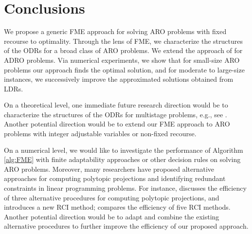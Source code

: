\documentclass[fleqn,mnsc,blindrev]{informs4}
\begin{document}
		
		\section{Conclusions} \label{sec:con}
		We propose a generic FME approach for solving ARO problems with fixed recourse to optimality. Through the lens of FME, we characterize the structures of the ODRs for a broad class of ARO problems. We extend the approach of \cite{bsz17} for ADRO problems. Via numerical experiments, we show that for small-size ARO problems our approach finds the optimal solution, and for moderate to large-size instances, we successively improve the approximated solutions obtained from LDRs. 
				
	     On a theoretical level, one immediate future research direction would be to characterize the structures of the ODRs for multistage problems, e.g., see \cite{bip10,iss13}.  {Another potential direction would be to extend our FME approach to ARO problems with integer adjustable variables or non-fixed recourse.}
		
		On a numerical level, we would like to investigate the performance of Algorithm \ref{alg:FME} with finite adaptability approaches or other decision rules on solving ARO problems.  Moreover, many researchers have proposed alternative approaches for computing polytopic projections and identifying redundant constraints in linear programming problems. For instance, \cite{hll92} discusses the efficiency of three alternative procedures for computing polytopic projections, and introduces a new RCI method; \cite{ps10} compares the efficiency of five RCI methods. Another potential direction would be to adapt and combine the existing alternative procedures to further improve the efficiency of our proposed approach.
		
		
		
\end{document}
